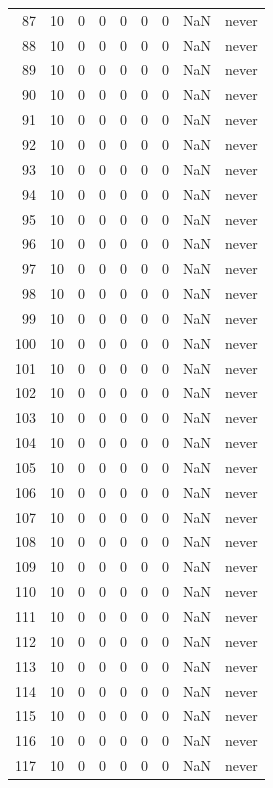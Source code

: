 \begin{longtable}{rrrrrrrrl}
87 & 10 & 0 & 0 & 0 & 0 & 0 & NaN & never \\
88 & 10 & 0 & 0 & 0 & 0 & 0 & NaN & never \\
89 & 10 & 0 & 0 & 0 & 0 & 0 & NaN & never \\
90 & 10 & 0 & 0 & 0 & 0 & 0 & NaN & never \\
91 & 10 & 0 & 0 & 0 & 0 & 0 & NaN & never \\
92 & 10 & 0 & 0 & 0 & 0 & 0 & NaN & never \\
93 & 10 & 0 & 0 & 0 & 0 & 0 & NaN & never \\
94 & 10 & 0 & 0 & 0 & 0 & 0 & NaN & never \\
95 & 10 & 0 & 0 & 0 & 0 & 0 & NaN & never \\
96 & 10 & 0 & 0 & 0 & 0 & 0 & NaN & never \\
97 & 10 & 0 & 0 & 0 & 0 & 0 & NaN & never \\
98 & 10 & 0 & 0 & 0 & 0 & 0 & NaN & never \\
99 & 10 & 0 & 0 & 0 & 0 & 0 & NaN & never \\
100 & 10 & 0 & 0 & 0 & 0 & 0 & NaN & never \\
101 & 10 & 0 & 0 & 0 & 0 & 0 & NaN & never \\
102 & 10 & 0 & 0 & 0 & 0 & 0 & NaN & never \\
103 & 10 & 0 & 0 & 0 & 0 & 0 & NaN & never \\
104 & 10 & 0 & 0 & 0 & 0 & 0 & NaN & never \\
105 & 10 & 0 & 0 & 0 & 0 & 0 & NaN & never \\
106 & 10 & 0 & 0 & 0 & 0 & 0 & NaN & never \\
107 & 10 & 0 & 0 & 0 & 0 & 0 & NaN & never \\
108 & 10 & 0 & 0 & 0 & 0 & 0 & NaN & never \\
109 & 10 & 0 & 0 & 0 & 0 & 0 & NaN & never \\
110 & 10 & 0 & 0 & 0 & 0 & 0 & NaN & never \\
111 & 10 & 0 & 0 & 0 & 0 & 0 & NaN & never \\
112 & 10 & 0 & 0 & 0 & 0 & 0 & NaN & never \\
113 & 10 & 0 & 0 & 0 & 0 & 0 & NaN & never \\
114 & 10 & 0 & 0 & 0 & 0 & 0 & NaN & never \\
115 & 10 & 0 & 0 & 0 & 0 & 0 & NaN & never \\
116 & 10 & 0 & 0 & 0 & 0 & 0 & NaN & never \\
117 & 10 & 0 & 0 & 0 & 0 & 0 & NaN & never \\

\end{longtable}
